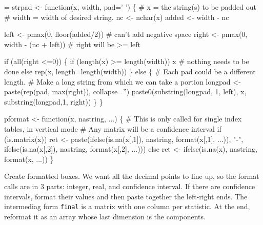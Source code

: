 \documentclass{article}
\newcommand{\code}[1]{\texttt{#1}}
\begin{document}
\begin{nwchunk}
=
 strpad <- function(x, width, pad=' ') \{
     # x = the string(s) to be padded out
     # width = width of desired string. 
     nc <- nchar(x)
     added <- width - nc
 
     left  <- pmax(0, floor(added/2))       # can't add negative space
     right <- pmax(0, width - (nc + left))  # right will be >= left
 
     if (all(right <=0)) \{
         if (length(x) >= length(width)) x  # nothing needs to be done
         else rep(x, length=length(width))
     \}
     else \{
         # Each pad could be a different length.
         # Make a long string from which we can take a portion
         longpad <- paste(rep(pad, max(right)), collapse='') 
         paste0(substring(longpad, 1, left), x, substring(longpad,1, right))
     \}
 \}
 
 pformat <- function(x, nastring, ...) \{
     # This is only called for single index tables, in vertical mode
     # Any matrix will be a confidence interval
     if (is.matrix(x)) 
         ret <- paste(ifelse(is.na(x[,1]), nastring,
                             format(x[,1],  ...)), "-", 
                      ifelse(is.na(x[,2]), nastring, 
                             format(x[,2],  ...)))
     else ret <- ifelse(is.na(x), nastring, format(x,  ...))
 \}
\end{nwchunk}

Create formatted boxes.  We want all the decimal points to line up,
so the format calls are in 3 parts: integer, real, and confidence interval.
If there are confidence intervals, format their values and then paste
together the left-right ends.
The intermediag form \code{final} is a matrix with one column per statistic.
At the end, reformat it as an array whose last dimension is the components.
\end{document}

